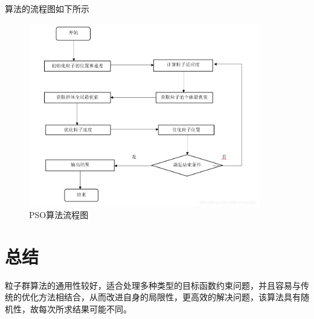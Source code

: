 算法的流程图如下所示
\begin{figure}[hbpt]
    \centering
    \includegraphics[width=0.9\textwidth]{figures/pso-flow.png}
    \caption{PSO算法流程图}
    \label{fig:pso_flow}
\end{figure}
\newpage
\section{总结}
粒子群算法的通用性较好，适合处理多种类型的目标函数约束问题，并且容易与传统的优化方法相结合，从而改进自身的局限性，更高效的解决问题，该算法具有随机性，故每次所求结果可能不同。



